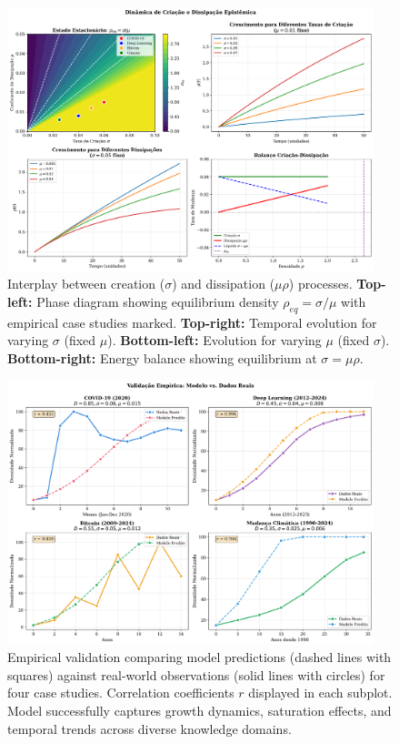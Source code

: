 \documentclass[12pt]{article}
\begin{document}
\begin{figure}[h]
    \centering
    \includegraphics[width=0.95\textwidth]{figures/creation_dissipation.png}
    \caption{Interplay between creation ($\sigma$) and dissipation ($\mu\rho$) processes. \textbf{Top-left:} Phase diagram showing equilibrium density $\rho_{eq} = \sigma/\mu$ with empirical case studies marked. \textbf{Top-right:} Temporal evolution for varying $\sigma$ (fixed $\mu$). \textbf{Bottom-left:} Evolution for varying $\mu$ (fixed $\sigma$). \textbf{Bottom-right:} Energy balance showing equilibrium at $\sigma = \mu\rho$.}
    \label{fig:creation_dissipation}
\end{figure}

\begin{figure}[h]
    \centering
    \includegraphics[width=0.95\textwidth]{figures/empirical_validation.png}
    \caption{Empirical validation comparing model predictions (dashed lines with squares) against real-world observations (solid lines with circles) for four case studies. Correlation coefficients $r$ displayed in each subplot. Model successfully captures growth dynamics, saturation effects, and temporal trends across diverse knowledge domains.}
    \label{fig:empirical}
\end{figure}
\end{document}
